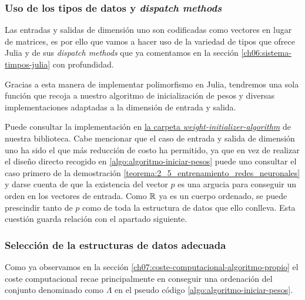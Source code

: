 \subsubsection{ Uso de los tipos de datos y \textit{ dispatch methods}}
Las entradas y salidas de dimensión uno son codificadas como vectores en lugar de matrices, 
es por ello que vamos a hacer uso de la variedad de tipos que ofrece Julia y de sus \textit{dispatch methods} que ya comentamos en 
la sección \ref{ch06:sistema-timpos-julia} con
 profundidad. 

 Gracias a esta manera de implementar polimorfismo 
 en Julia, tendremos una sola función que recoja a 
 nuestro algoritmo de inicialización de pesos y diversas implementaciones adaptadas a la dimensión de entrada y salida. 

 Puede consultar la implementación en \href{https://github.com/BlancaCC/TFG-Estudio-de-las-redes-neuronales/tree/main/OptimizedNeuralNetwork.jl/src}{la carpeta \textit{weight-initializer-algorithm}} de nuestra biblioteca. 
 Cabe mencionar que el caso de entrada y salida de dimensión uno ha sido el que más reducción de costo 
 ha permitido, ya que en vez de realizar 
 el diseño directo recogido en \ref{algo:algoritmo-iniciar-pesos} puede uno consultar 
 el caso primero de la demostración  \ref{teorema:2_5_entrenamiento_redes_neuronales}
 y darse cuenta de que la existencia del vector $p$ 
 es una argucia para conseguir un orden en los vectores de entrada. Como $\mathbb{R}$ ya es un cuerpo ordenado, se puede prescindir tanto de $p$ como de toda la estructura de datos que ello conlleva. 
 Esta cuestión guarda relación con el apartado siguiente. 

\subsubsection{Selección de la estructuras de datos adecuada}
Como ya observamos en  la sección \ref{ch07:coste-computacional-algoritmo-propio} el coste computacional recae principalmente en conseguir una ordenación del conjunto denominado como 
$\Lambda$ en el pseudo código \ref{algo:algoritmo-iniciar-pesos}. 


